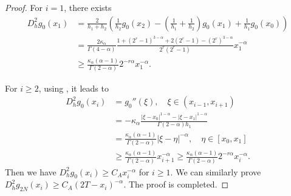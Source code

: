 \documentclass{amsart}
\theoremstyle{definition}
\theoremstyle{remark}
\numberwithin{equation}{section}
\begin{document}
\begin{proof}
  For \(i=1\), there exists
  \begin{equation*}
    \begin{aligned}
      D_h^2 g_0(x_1) &= \frac{2}{h_{1} + h_{2}} \left( \frac{1}{h_{2}} g_0(x_{2}) - (\frac{1}{h_{1}}+\frac{1}{h_{2}})g_0(x_{1}) + \frac{1}{h_{1}} g_0(x_{0}) \right)                                                       \\
        &= \frac{2\kappa_\alpha}{\Gamma(4-\alpha)} \frac{1+(2^r-1)^{3-\alpha} + 2(2^r-1) - (2^r)^{3-\alpha} }{2^r (2^r-1)} x_1^{-\alpha} \\
        &\ge  \frac{\kappa_\alpha(\alpha-1)}{\Gamma(2-\alpha)}2^{-r\alpha} x_1^{-\alpha} .
    \end{aligned}
  \end{equation*}

  For \(i \ge 2\), using , it leads to
  \begin{equation*}
    \begin{aligned}
      D_h^2 g_0(x_i) &=  g_0''(\xi) , \quad \xi \in (x_{i-1}, x_{i+1}) \\
                 & =  -\kappa_\alpha \frac{|\xi-x_0|^{1-\alpha} - |\xi-x_1|^{1-\alpha}}{\Gamma(2-\alpha)h_1}                                               \\
                 & = \frac{\kappa_\alpha(\alpha-1)}{\Gamma(2-\alpha)}  |\xi-\eta|^{-\alpha} , \quad \eta\in [x_0, x_1]                                              \\
                 & \ge \frac{\kappa_\alpha(\alpha-1)}{\Gamma(2-\alpha)} x_{i+1}^{-\alpha}  
                 \ge \frac{\kappa_\alpha(\alpha-1)}{\Gamma(2-\alpha)} 2^{-r\alpha} x_{i}^{-\alpha} .
    \end{aligned}
  \end{equation*}
  Then we have
  \(
    D_h^2 g_0(x_i) \ge C_A x_i^{-\alpha}
  \) for $i\ge 1$.
  We can similarly prove
  \(
    D_h^2 g_{2N}(x_i) \ge C_A (2T-x_i)^{-\alpha} 
  \). The proof is completed.
\end{proof}
\end{document}
